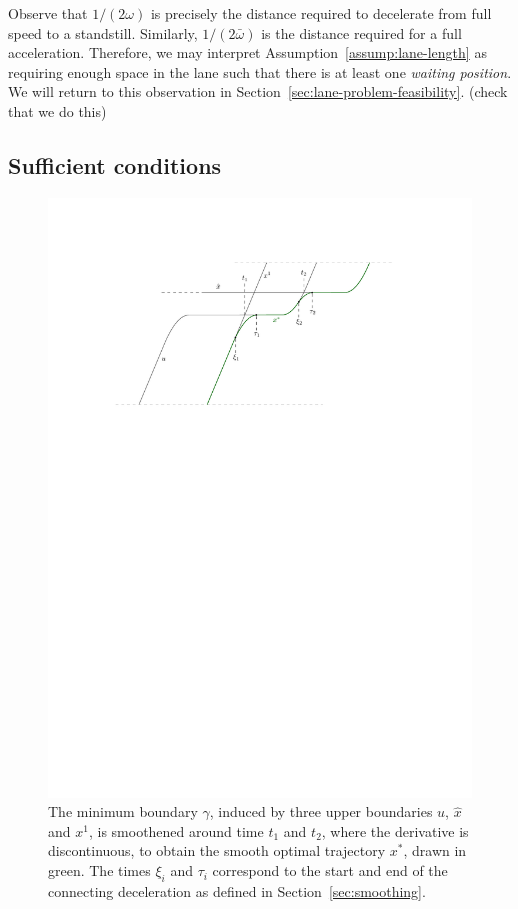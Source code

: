 \documentclass[a4paper]{report}
\theoremstyle{definition}
\theoremstyle{plain}
\newcommand\note[1]{{\color{Navy}#1}}
\begin{document}
Observe that $1/(2\omega)$ is precisely the distance required to decelerate from
full speed to a standstill. Similarly, $1/(2\bar{\omega})$ is the distance
required for a full acceleration. Therefore, we may interpret
Assumption~\ref{assump:lane-length} as requiring enough space in the lane such
that there is at least one \emph{waiting position}.
%
We will return to this observation in
Section~\ref{sec:lane-problem-feasibility}.
\note{(check that we do this)}


\subsection{Sufficient conditions}\label{sec:optimal-trajectory}

\begin{figure}
  \centering
  \includegraphics[scale=1]{figures/motion/proof}
  \caption{The minimum boundary $\gamma$, induced by three upper boundaries
    $u$, $\hat{x}$ and $x^{1}$, is smoothened around time $t_{1}$ and
    $t_{2}$, where the derivative is discontinuous, to obtain the smooth optimal
    trajectory $x^{*}$, drawn in green. The times $\xi_{i}$ and $\tau_{i}$
    correspond to the start and end of the connecting deceleration as
    defined in Section~\ref{sec:smoothing}.}%
  \label{fig:optimal-construction}
\end{figure}
\end{document}
